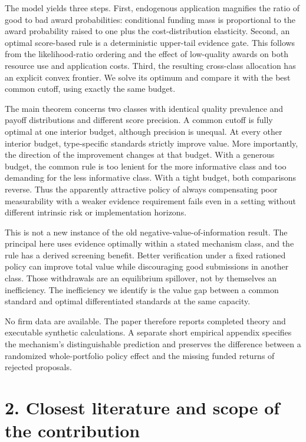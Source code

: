 \documentclass[
  11pt,
]{article}
\begin{document}
The model yields three steps. First, endogenous application magnifies
the ratio of good to bad award probabilities: conditional funding mass
is proportional to the award probability raised to one plus the
cost-distribution elasticity. Second, an optimal score-based rule is a
deterministic upper-tail evidence gate. This follows from the
likelihood-ratio ordering and the effect of low-quality awards on both
resource use and application costs. Third, the resulting cross-class
allocation has an explicit convex frontier. We solve its optimum and
compare it with the best common cutoff, using exactly the same budget.

The main theorem concerns two classes with identical quality prevalence
and payoff distributions and different score precision. A common cutoff
is fully optimal at one interior budget, although precision is unequal.
At every other interior budget, type-specific standards strictly improve
value. More importantly, the direction of the improvement changes at
that budget. With a generous budget, the common rule is too lenient for
the more informative class and too demanding for the less informative
class. With a tight budget, both comparisons reverse. Thus the
apparently attractive policy of always compensating poor measurability
with a weaker evidence requirement fails even in a setting without
different intrinsic risk or implementation horizons.

This is not a new instance of the old negative-value-of-information
result. The principal here uses evidence optimally within a stated
mechanism class, and the rule has a derived screening benefit. Better
verification under a fixed rationed policy can improve total value while
discouraging good submissions in another class. Those withdrawals are an
equilibrium spillover, not by themselves an inefficiency. The
inefficiency we identify is the value gap between a common standard and
optimal differentiated standards at the same capacity.

No firm data are available. The paper therefore reports completed theory
and executable synthetic calculations. A separate short empirical
appendix specifies the mechanism's distinguishable prediction and
preserves the difference between a randomized whole-portfolio policy
effect and the missing funded returns of rejected proposals.

\section{2. Closest literature and scope of the
contribution}\label{closest-literature-and-scope-of-the-contribution}
\end{document}
